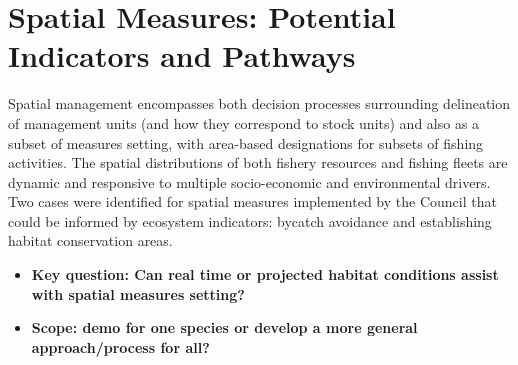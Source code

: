 \documentclass[
]{article}
\author{}
\date{\vspace{-2.5em}}
\providecommand{\tightlist}{%
  \setlength{\itemsep}{0pt}\setlength{\parskip}{0pt}}
\begin{document}
\vspace{-1cm}

\section{Spatial Measures: Potential Indicators and
Pathways}\label{spatial-measures-potential-indicators-and-pathways}

\begin{noteblock}
Spatial management encompasses both decision processes surrounding
delineation of management units (and how they correspond to stock units)
and also as a subset of measures setting, with area-based designations
for subsets of fishing activities. The spatial distributions of both
fishery resources and fishing fleets are dynamic and responsive to
multiple socio-economic and environmental drivers. Two cases were
identified for spatial measures implemented by the Council that could be
informed by ecosystem indicators: bycatch avoidance and establishing
habitat conservation areas.

\end{noteblock}

\begin{itemize}
\tightlist
\item
  \textbf{Key question: Can real time or projected habitat conditions
  assist with spatial measures setting?}
\item
  \textbf{Scope: demo for one species or develop a more general
  approach/process for all?}
\end{itemize}
\end{document}
